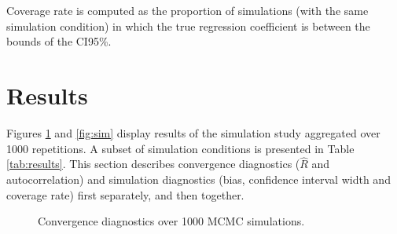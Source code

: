 \documentclass[article]{jss}
\begin{document}
Coverage rate is computed as the proportion of simulations (with the same simulation condition) in which the true regression coefficient is between the bounds of the CI95\%. 





\section{Results}


Figures \ref{fig:conv} and \ref{fig:sim} display results of the simulation study aggregated over 1000 repetitions. A subset of simulation conditions is presented in Table \ref{tab:results}. This section describes convergence diagnostics ($\widehat{R}$ and autocorrelation) and simulation diagnostics (bias, confidence interval width and coverage rate) first separately, and then together.

\begin{figure}[h]
  \caption{Convergence diagnostics over 1000 MCMC simulations.}
    \label{fig:conv}
\end{figure}
\end{document}
